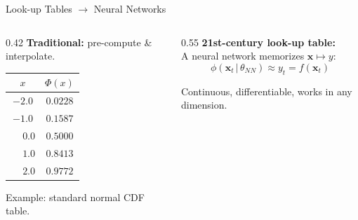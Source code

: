 \documentclass[aspectratio=169,11pt]{beamer}
\newcommand{\emphc}[1]{\textcolor{harvardcrimson}{#1}}
\newcommand{\x}{\bm{x}}
\begin{document}
\begin{frame}{Look-up Tables $\to$ Neural Networks}
\begin{columns}[T]
\begin{column}{0.42\textwidth}
\textbf{Traditional:} pre-compute \& interpolate.\\[2pt]
\begin{center}
\footnotesize
\begin{tabular}{cc}
\toprule
$x$ & $\Phi(x)$ \\
\midrule
$-2.0$ & $0.0228$ \\
$-1.0$ & $0.1587$ \\
$\phantom{-}0.0$ & $0.5000$ \\
$\phantom{-}1.0$ & $0.8413$ \\
$\phantom{-}2.0$ & $0.9772$ \\
\bottomrule
\end{tabular}
\end{center}
\vspace{2pt}
{\footnotesize Example: standard normal CDF table.}
\end{column}

\begin{column}{0.55\textwidth}
\textbf{21st-century look-up table:}\\[2pt]
A neural network memorizes $\x \mapsto y$:
\[
\phi(\x_t\,|\,\theta_{NN}) \approx y_t = f(\x_t)
\]
\vspace{-4pt}
\begin{center}
\end{center}
\vspace{2pt}
{\footnotesize \emphc{Continuous}, \emphc{differentiable}, works in \emphc{any dimension}.}
\end{column}
\end{columns}
\end{frame}
\end{document}
